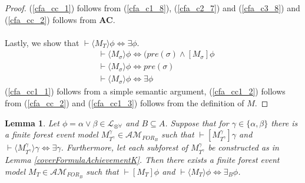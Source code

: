 \documentclass[12pt, a4paper, titlepage]{scrartcl}
\newtheorem{lemma}{Lemma}[subsection]
\numberwithin{equation}{section}
\newcommand{\sqex}[1]{[{#1}]}
\newcommand{\anex}[1]{\langle {#1} \rangle}
\newcommand{\lang}{\mathcal{L}}
\newcommand{\langArbAct}{\lang_{\otimes\forall}}
\newcommand{\axAC}{{\bf AC}}
\newcommand{\eventClass}{\mathcal{AM}}
\newcommand{\forestClass}{\eventClass_{FOR}}
\begin{document}
\begin{proof}
(\ref{cfa_cc_1}) follows from (\ref{cfa_c1_8}), (\ref{cfa_c2_7}) and (\ref{cfa_c3_8}) and
(\ref{cfa_cc_2}) follows from \axAC.\\
\\
Lastly, we show that $\vdash \anex{ M_T } \phi \iff \exists \phi$.
\begin{align}
	& \vdash \anex{ M_\sigma } \phi \iff (pre(\sigma) \land [ M_\sigma ] \phi \label{cfa_cc1_1}\\
	& \vdash \anex{ M_\sigma } \phi \iff pre(\sigma) \label{cfa_cc1_2}\\
	& \vdash \anex{ M_\sigma } \phi \iff \exists \phi\label{cfa_cc1_3}
\end{align}
(\ref{cfa_cc1_1}) follows from a simple semantic argument, (\ref{cfa_cc1_2}) follows from
(\ref{cfa_cc_2}) and (\ref{cfa_cc1_3}) follows from the definition of $M$.
\end{proof}

\begin{lemma} \label{disjunctionFormulaAchievementK}
Let $\phi = \alpha \lor \beta \in \langArbAct$ and $B \subseteq A$.
Suppose that for $\gamma \in \{\alpha, \beta\}$ there is a finite forest event model
$M^\gamma_{T^\gamma} \in \forestClass_B$ such that
$\vdash \sqex{M^\gamma_{T^\gamma}} \gamma$
and $\vdash \anex{ M^\gamma_{T^\gamma} } \gamma \iff \exists \gamma$.
Furthermore, let each subforest of $M^\gamma_{T^\gamma}$ be constructed as in Lemma \ref{coverFormulaAchievementK}.
Then there exists a finite forest event model $M_T \in \forestClass_B$ such that $\vdash \sqex{M_T}\phi$ and
$\vdash \anex{ M_T } \phi \iff \exists_B \phi$.
\end{lemma}
\end{document}

